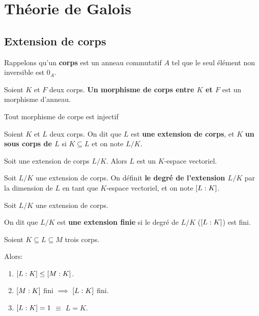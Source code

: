 \chapter{Théorie de Galois}

\section{Extension de corps}

Rappelons qu'un \textbf{corps} est un anneau commutatif $A$ tel que le seul
élément non inversible est $0_{A}$.

\begin{definition} 
	\label{def:morphisme_corps}
	Soient $K$ et $F$ deux corps. \textbf{Un morphisme de corps entre $K$ et $F$}
	est un morphisme d'anneau.
\end{definition}

\begin{proposition}
	Tout morphisme de corps est injectif
\end{proposition}

\begin{definition} 
	\label{def:extension_sous_corps}
	Soient $K$ et $L$ deux corps. On dit que $L$ est \textbf{une extension de
	corps}, et $K$ \textbf{un sous corps de $L$} si $K \subseteq L$ et on note
	$L/K$.
\end{definition}

\begin{proposition}
	Soit une extension de corps $L/K$. Alors $L$ est un $K$-espace vectoriel.
\end{proposition}

\begin{definition} 
	\label{def:degre_extension}
	Soit $L/K$ une extension de corps. On définit \textbf{le degré de
	l'extension $L/K$} par la dimension de $L$ en tant que $K$-espace
	vectoriel, et on note $[L : K]$.
\end{definition}

\begin{definition} 
	Soit $L/K$ une extension de corps.

	On dit que $L/K$ est \textbf{une extension finie} si le degré de $L/K$
	($[L : K]$) est fini.
\end{definition}

\begin{remarque}
	Soient $K \subseteq L \subseteq M$ trois corps.

	Alors:
	\begin{enumerate}
		\item $[L : K] \leq [M : K]$.
		\item $[M : K]$ fini $\implies$ $[L : K]$
			fini.
		\item $[L : K] = 1$ $\equiv$ $L = K$.
	\end{enumerate}
\end{remarque}

